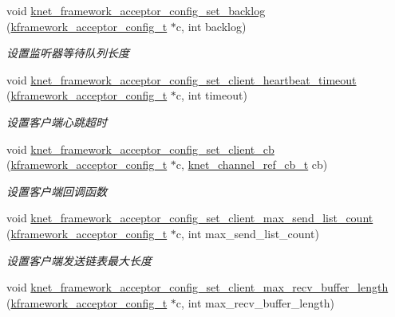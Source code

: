 \begin{DoxyCompactItemize}
void \hyperlink{a00111_gab236e9cd130017f98625904439052b30_gab236e9cd130017f98625904439052b30}{knet\+\_\+framework\+\_\+acceptor\+\_\+config\+\_\+set\+\_\+backlog} (\hyperlink{a00054_a39c993eb450173e4fde04498d757f9b6_a39c993eb450173e4fde04498d757f9b6}{kframework\+\_\+acceptor\+\_\+config\+\_\+t} $\ast$c, int backlog)
\begin{DoxyCompactList}\small\item\em 设置监听器等待队列长度 \end{DoxyCompactList}\item 
void \hyperlink{a00111_ga0f1a47656155b56aa812b07d44a8aa81_ga0f1a47656155b56aa812b07d44a8aa81}{knet\+\_\+framework\+\_\+acceptor\+\_\+config\+\_\+set\+\_\+client\+\_\+heartbeat\+\_\+timeout} (\hyperlink{a00054_a39c993eb450173e4fde04498d757f9b6_a39c993eb450173e4fde04498d757f9b6}{kframework\+\_\+acceptor\+\_\+config\+\_\+t} $\ast$c, int timeout)
\begin{DoxyCompactList}\small\item\em 设置客户端心跳超时 \end{DoxyCompactList}\item 
void \hyperlink{a00111_ga03a86f8b8fc13e6fb8f1ca75e7f14d7a_ga03a86f8b8fc13e6fb8f1ca75e7f14d7a}{knet\+\_\+framework\+\_\+acceptor\+\_\+config\+\_\+set\+\_\+client\+\_\+cb} (\hyperlink{a00054_a39c993eb450173e4fde04498d757f9b6_a39c993eb450173e4fde04498d757f9b6}{kframework\+\_\+acceptor\+\_\+config\+\_\+t} $\ast$c, \hyperlink{a00054_a8a7d96123ef4565c6d08fe58a10476a9_a8a7d96123ef4565c6d08fe58a10476a9}{knet\+\_\+channel\+\_\+ref\+\_\+cb\+\_\+t} cb)
\begin{DoxyCompactList}\small\item\em 设置客户端回调函数 \end{DoxyCompactList}\item 
void \hyperlink{a00111_ga23b21427272c85b9730304add2cbd054_ga23b21427272c85b9730304add2cbd054}{knet\+\_\+framework\+\_\+acceptor\+\_\+config\+\_\+set\+\_\+client\+\_\+max\+\_\+send\+\_\+list\+\_\+count} (\hyperlink{a00054_a39c993eb450173e4fde04498d757f9b6_a39c993eb450173e4fde04498d757f9b6}{kframework\+\_\+acceptor\+\_\+config\+\_\+t} $\ast$c, int max\+\_\+send\+\_\+list\+\_\+count)
\begin{DoxyCompactList}\small\item\em 设置客户端发送链表最大长度 \end{DoxyCompactList}\item 
void \hyperlink{a00111_ga44e90ae8fe6b358dbcd77c447ead94fc_ga44e90ae8fe6b358dbcd77c447ead94fc}{knet\+\_\+framework\+\_\+acceptor\+\_\+config\+\_\+set\+\_\+client\+\_\+max\+\_\+recv\+\_\+buffer\+\_\+length} (\hyperlink{a00054_a39c993eb450173e4fde04498d757f9b6_a39c993eb450173e4fde04498d757f9b6}{kframework\+\_\+acceptor\+\_\+config\+\_\+t} $\ast$c, int max\+\_\+recv\+\_\+buffer\+\_\+length)

\end{DoxyCompactItemize}
